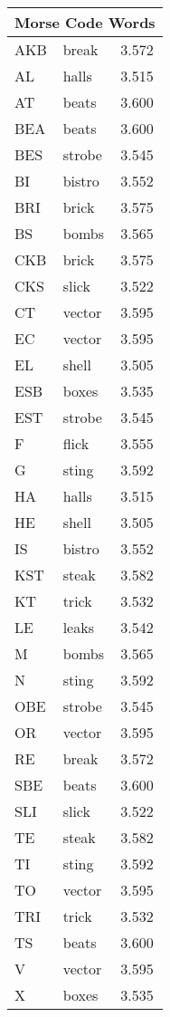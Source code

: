 \documentclass[11pt]{article}
\begin{document}
\begin{multicols}{3}
\begin{tabular}{|l|l|l|}
\hline
\multicolumn{3}{|c|}{Morse Code Words} \\
\hline
AKB & break & 3.572 \\
AL & halls & 3.515 \\
AT & beats & 3.600 \\
BEA & beats & 3.600 \\
BES & strobe & 3.545 \\
BI & bistro & 3.552 \\
BRI & brick & 3.575 \\
BS & bombs & 3.565 \\
CKB & brick & 3.575 \\
CKS & slick & 3.522 \\
CT & vector & 3.595 \\
EC & vector & 3.595 \\
EL & shell & 3.505 \\
ESB & boxes & 3.535 \\
EST & strobe & 3.545 \\
F & flick & 3.555 \\
G & sting & 3.592 \\
HA & halls & 3.515 \\
HE & shell & 3.505 \\
IS & bistro & 3.552 \\
KST & steak & 3.582 \\
KT & trick & 3.532 \\
LE & leaks & 3.542 \\
M & bombs & 3.565 \\
N & sting & 3.592 \\
OBE & strobe & 3.545 \\
OR & vector & 3.595 \\
RE & break & 3.572 \\
SBE & beats & 3.600 \\
SLI & slick & 3.522 \\
TE & steak & 3.582 \\
TI & sting & 3.592 \\
TO & vector & 3.595 \\
TRI & trick & 3.532 \\
TS & beats & 3.600 \\
V & vector & 3.595 \\
X & boxes & 3.535 \\
\hline
\end{tabular}


\end{multicols}
\end{document}
